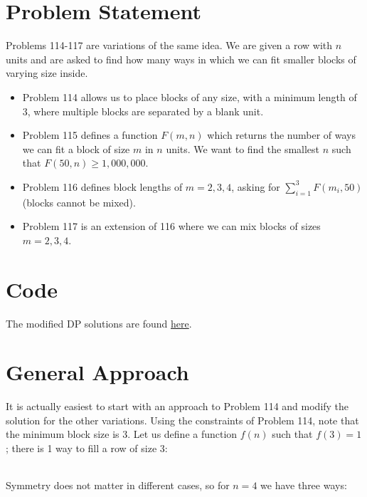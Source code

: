 \documentclass{article}
\begin{document}
    
\section{Problem Statement}

Problems 114-117 are variations of the same idea.
We are given a row with $n$ units and are asked to find how many ways
in which we can fit smaller blocks of varying size inside.
\begin{itemize}
	\item Problem 114 allows us to place blocks of any size, with a minimum length of 3, where multiple blocks are separated by a blank unit.
	\item Problem 115 defines a function $F(m,n)$ which returns the number of ways we can fit a block of size $m$ in $n$ units.
	We want to find the smallest $n$ such that $F(50,n)\geq 1,000,000$.
	\item Problem 116 defines block lengths of $m =2, 3, 4$, asking for $\sum_{i=1}^3F(m_i,50)$ (blocks cannot be mixed).
	\item Problem 117 is an extension of 116 where we can mix blocks of sizes $m=2,3,4$.
\end{itemize}

\section{Code}

The modified DP solutions are found \href{https://github.com/sidnb13/project-euler/blob/master/code/114-dp.py}{here}.

\section{General Approach}

It is actually easiest to start with an approach to Problem 114 and modify the solution for the other variations.
Using the constraints of Problem 114, note that the minimum block size is 3.
Let us define a function $f(n)$ such that $f(3)=1$; there is 1 way to fill a row
of size 3:

\begin{center}
	\begin{tabular}{|c|c|c|}
		\hline
		\cellcolor{red}&\cellcolor{red}&\cellcolor{red}\\
		\hline
	\end{tabular}
\end{center}

Symmetry does not matter in different cases, so for $n=4$ we have three ways:
\end{document}
